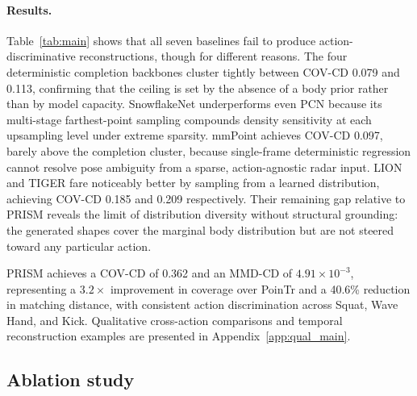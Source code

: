 \documentclass{article}
\begin{document}
\paragraph{Results.}
Table~\ref{tab:main} shows that all seven baselines fail to produce
action-discriminative reconstructions, though for different reasons.
The four deterministic completion backbones cluster tightly between COV-CD 0.079
and 0.113, confirming that the ceiling is set by the absence of a body prior rather
than by model capacity.
SnowflakeNet underperforms even PCN because its multi-stage farthest-point sampling
compounds density sensitivity at each upsampling level under extreme sparsity.
mmPoint achieves COV-CD 0.097, barely above the completion cluster, because
single-frame deterministic regression cannot resolve pose ambiguity from a sparse,
action-agnostic radar input.
LION and TIGER fare noticeably better by sampling from a learned distribution,
achieving COV-CD 0.185 and 0.209 respectively.
Their remaining gap relative to PRISM reveals the limit of distribution diversity
without structural grounding: the generated shapes cover the marginal body
distribution but are not steered toward any particular action.

PRISM achieves a COV-CD of 0.362 and an MMD-CD of $4.91\!\times\!10^{-3}$,
representing a $3.2\times$ improvement in coverage over PoinTr and a 40.6\%
reduction in matching distance, with consistent action discrimination across
Squat, Wave Hand, and Kick.
Qualitative cross-action comparisons and temporal reconstruction examples are
presented in Appendix~\ref{app:qual_main}.

\subsection{Ablation study}
\label{sec:ablation}
\end{document}
